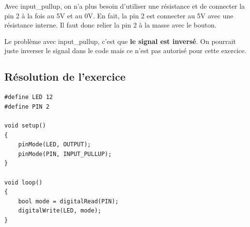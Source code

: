 \documentclass[a4paper]{article}
\begin{document}
Avec input\_pullup, on n'a plus besoin d'utiliser une résistance et de connecter la pin 2 à la fois au 5V et au 0V. En fait, la pin 2 est connecter au 5V avec une résistance interne. Il faut donc relier la pin 2 à la masse avec le bouton.

\begin{center}
\end{center}





Le problème avec input\_pullup, c'est que \textbf{le signal est inversé}. On pourrait juste inverser le signal dans le code mais ce n'est pas autorisé pour cette exercice.

\begin{center}
\end{center}










\subsection{Résolution de l'exercice}





\begin{lstlisting}[frame=single]
#define LED 12
#define PIN 2

void setup()
{
    pinMode(LED, OUTPUT);
    pinMode(PIN, INPUT_PULLUP);
}

void loop()
{
    bool mode = digitalRead(PIN);
    digitalWrite(LED, mode);
}
\end{lstlisting}
\end{document}
